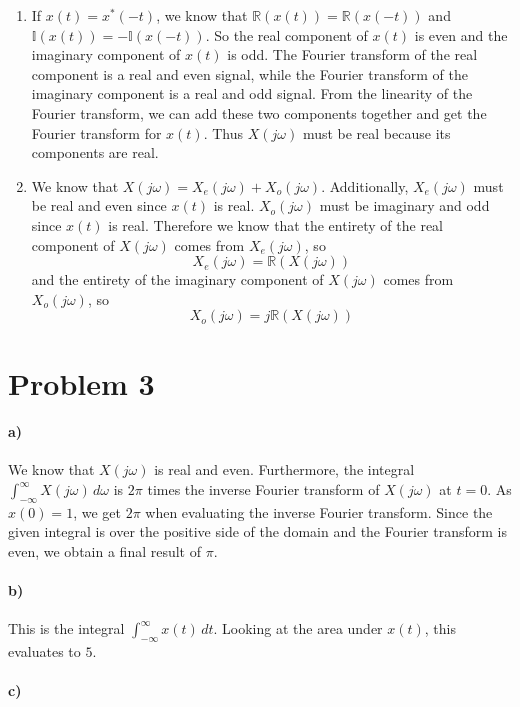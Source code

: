 \documentclass[12pt]{article}
\begin{document}
\begin{enumerate}
    \item If \(x(t)=x^*(-t)\), we know that \(\mathbb{R}(x(t))=\mathbb{R}(x(-t))\) and \(\mathbb{I}(x(t))=-\mathbb{I}(x(-t))\). So the real component of \(x(t)\) is even and the imaginary component of \(x(t)\)
    is odd. The Fourier transform of the real component is a real and even signal, while the Fourier transform of the imaginary component is a real and odd signal. From the linearity of the Fourier transform, we can
    add these two components together and get the Fourier transform for \(x(t)\). Thus \(X(j\omega)\) must be real because its components are real.
    \item We know that \(X(j\omega)=X_e(j\omega)+X_o(j\omega)\). Additionally, \(X_e(j\omega)\) must be real and even since \(x(t)\) is real. \(X_o(j\omega)\) must be imaginary and odd since \(x(t)\) is real.
    Therefore we know that the entirety of the real component of \(X(j\omega)\) comes from \(X_e(j\omega)\), so
    \[X_e(j\omega)=\mathbb{R}(X(j\omega))\]
    and the entirety of the imaginary component of \(X(j\omega)\) comes from \(X_o(j\omega)\), so
    \[X_o(j\omega)=j\mathbb{R}(X(j\omega))\]
\end{enumerate}

\section*{Problem 3}

\paragraph{a)}

We know that \(X(j\omega)\) is real and even. Furthermore, the integral \(\int_{-\infty}^\infty X(j\omega)\, d\omega\) is \(2\pi\) times the
inverse Fourier transform of \(X(j\omega)\) at \(t=0\). As \(x(0)=1\), we get \(2\pi\) when evaluating the inverse Fourier transform. Since the given
integral is over the positive side of the domain and the Fourier transform is even, we obtain a final result of \(\pi\).

\paragraph{b)}

This is the integral \(\int_{-\infty}^\infty x(t)\,dt\). Looking at the area under \(x(t)\), this evaluates to \(5\).

\paragraph{c)}
\end{document}
